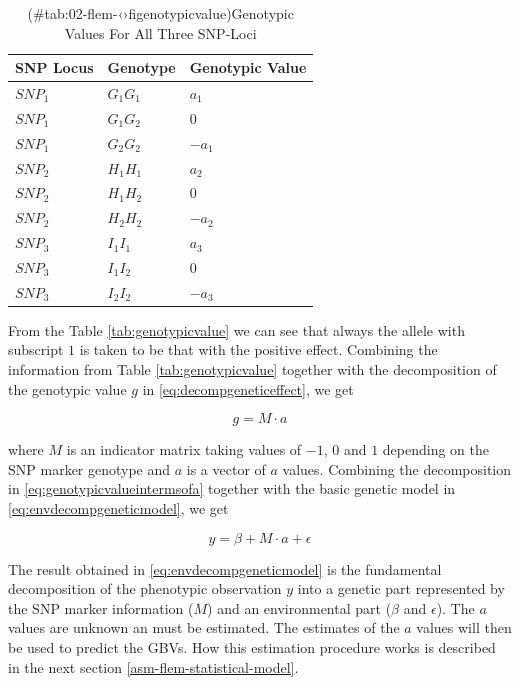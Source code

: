 \documentclass[]{book}
\theoremstyle{definition}
\theoremstyle{definition}
\theoremstyle{definition}
\theoremstyle{remark}
\begin{document}
\begin{longtable}[t]{lll}
\caption{(\#tab:02-flem-‹›ﬁgenotypicvalue)Genotypic Values For All Three SNP-Loci}\\
\toprule
SNP Locus & Genotype & Genotypic Value\\
\midrule
$SNP_1$ & $G_1G_1$ & $a_1$\\
$SNP_1$ & $G_1G_2$ & $0$\\
$SNP_1$ & $G_2G_2$ & $-a_1$\\
$SNP_2$ & $H_1H_1$ & $a_2$\\
$SNP_2$ & $H_1H_2$ & $0$\\
\addlinespace
$SNP_2$ & $H_2H_2$ & $-a_2$\\
$SNP_3$ & $I_1I_1$ & $a_3$\\
$SNP_3$ & $I_1I_2$ & $0$\\
$SNP_3$ & $I_2I_2$ & $-a_3$\\
\bottomrule
\end{longtable}

From the Table \ref{tab:genotypicvalue} we can see that always the allele with subscript \(1\) is taken to be that with the positive effect. Combining the information from Table \ref{tab:genotypicvalue} together with the decomposition of the genotypic value \(g\) in \eqref{eq:decompgeneticeffect}, we get

\begin{equation}
  g = M \cdot a
  \label{eq:genotypicvalueintermsofa}
\end{equation}

where \(M\) is an indicator matrix taking values of \(-1\), \(0\) and \(1\) depending on the SNP marker genotype and \(a\) is a vector of \(a\) values. Combining the decomposition in \eqref{eq:genotypicvalueintermsofa} together with the basic genetic model in \eqref{eq:envdecompgeneticmodel}, we get

\begin{equation}
  y = \beta + M \cdot a + \epsilon
  \label{eq:finalgeneticmodel}
\end{equation}

The result obtained in \eqref{eq:envdecompgeneticmodel} is the fundamental decomposition of the phenotypic observation \(y\) into a genetic part represented by the SNP marker information (\(M\)) and an environmental part (\(\beta\) and \(\epsilon\)). The \(a\) values are unknown an must be estimated. The estimates of the \(a\) values will then be used to predict the GBVs. How this estimation procedure works is described in the next section \ref{asm-flem-statistical-model}.
\end{document}
